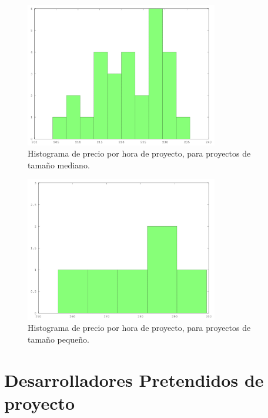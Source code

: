 \begin{figure}[H]
\begin{center}
 \includegraphics[width=0.75\textwidth,height=0.75\textheight,keepaspectratio]{./images/data-medium-money.png}
\end{center}
\caption{Histograma de precio por hora de proyecto, para proyectos de tamaño mediano.}
\end{figure}

\begin{figure}[H]
\begin{center}
 \includegraphics[width=0.75\textwidth,height=0.75\textheight,keepaspectratio]{./images/data-small-money.png}
\end{center}
\caption{Histograma de precio por hora de proyecto, para proyectos de tamaño pequeño.}
\end{figure}

\section*{Desarrolladores Pretendidos de proyecto}
 

